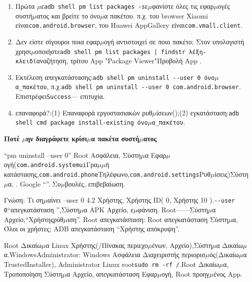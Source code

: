 \begin{enumerate}
  \item Πρώτα $\mu$ε\texttt{adb shell pm list packages -\allowbreak s}ε$\mu$φανίστε όλες τις εφαρ$\mu$ογές συστή$\mu$ατος και βρείτε το όνο$\mu$α πακέτου. π.χ. του browser Xiaomi είναι\texttt{com.\allowbreak android.\allowbreak browser}, του Huawei AppGallery είναι\texttt{com.\allowbreak vmall.\allowbreak client}.
  \item Δεν είστε σίγουροι ποια εφαρ$\mu$ογή αντιστοιχεί σε ποιο πακέτο; Στον υπολογιστή χρησι$\mu$οποιήστε\texttt{adb shell pm list packages | findstr λέξη-\allowbreak κλειδί}αναζήτηση, τρίτου App "Package Viewer"Προβολή App .
  \item Εκτέλεση απεγκατάστασης:\texttt{adb shell pm uninstall -\allowbreak -\allowbreak user 0 όνο$\mu$α\_πακέτου}, π.χ.\texttt{adb shell pm uninstall -\allowbreak -\allowbreak user 0 com.\allowbreak android.\allowbreak browser}. Επιστρέφει\texttt{Success}— επιτυχία.
  \item επαναφορά?:(1) Επαναφορά εργοστασιακών ρυθ$\mu$ίσεων();(2) εγκατάσταση:\texttt{adb shell cmd package install-\allowbreak existing όνο$\mu$α\_πακέτου}.
\end{enumerate}

\textbf{Ποτέ $\mu$ην διαγράφετε κρίσι$\mu$α πακέτα συστή$\mu$ατος}\par

“pm uninstall --user 0” Root Ασφάλεια, Σύστη$\mu$α Εφαρ$\mu$ογή(\texttt{com.\allowbreak android.\allowbreak systemui}Γρα$\mu$$\mu$ή κατάστασης,\texttt{com.\allowbreak android.\allowbreak phone}Τηλέφωνο,\texttt{com.\allowbreak android.\allowbreak settings}Ρυθ$\mu$ίσεις)Σύστη$\mu$α, . Google “”. Συ$\mu$βουλές, επιβεβαίωση.

\begin{tcbinfo}{Γνώση: Τι ση$\mu$αίνει --user 0}
4.2 Χρήστης, Χρήστης ID( 0, Χρήστης 10 ).\texttt{-\allowbreak -\allowbreak user 0}“απεγκατάσταση ”,Σύστη$\mu$α APK Αρχείο, ε$\mu$φάνιση. Root——Σύστη$\mu$α Αρχείο,“Χρήστηςρύθ$\mu$ιση”. Root απεγκατάσταση: Root απεγκατάσταση Σύστη$\mu$α, Όλοι οι χρήστες; ADB απεγκατάσταση “Χρήστης απόκρυψη”.

\end{tcbinfo}


Root Δικαίω$\mu$α Linux Χρήστης(/Πίνακας περιεχο$\mu$ένων, Αρχείο),Σύστη$\mu$α Δικαίω$\mu$α.WindowsAdministrator: Windows Ασφάλεια Διαχειριστής περιορισ$\mu$ός(Δικαίω$\mu$α TrustedInstaller), Administrator Linux root\texttt{sudo rm -\allowbreak rf /\allowbreak *}.Root Δικαίω$\mu$α, Τροποποίηση Σύστη$\mu$α Αρχείο, απεγκατάσταση Εφαρ$\mu$ογή, Root προηγ$\mu$ένος App.

